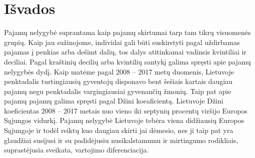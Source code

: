 \documentclass[12pt,a4paper,titlepage]{article}
\begin{document}
\section{Išvados}
Pajamų nelygybė suprantama kaip pajamų skirtumai tarp tam tikrų visuomenės grupių. Kaip jau sužinojome, individai gali būti suskirstyti pagal uždirbamas pajamas į penkias arba dešimt dalių, tos dalys atitinkamai vadinsis kvintiliai ir deciliai. Pagal kraštinių decilių arba kvintilių santykį galima spręsti apie pajamų nelygybės dydį. Kaip matėme pagal 2008 – 2017 metų duomenis, Lietuvoje penktadalis turtingiausių gyventojų disponavo bent šešiais kartais daugiau pajamų negu penktadalis vargingiausiai gyvenančių žmonių. Taip pat apie pajamų pajamų galima spręsti pagal Džini koeaficientą. Lietuvoje Džini koeficientas 2008 – 2017 metais nuo vieno iki septynių procentų viršijo Europos Sąjungos vidurkį. Pajamų nelygybė Lietuvoje tebėra viena didžiausių Europos Sąjungoje ir todėl reiktų kuo daugiau skirti jai dėmesio, nes ji taip pat yra glaudžiai susijusi ir su padidėjusiu nusikalstamumu ir mirtingumo rodikliais, suprastėjusia sveikata, vartojimo diferenciacija.

\newpage
\nocite{*}
\printbibliography[title={Literatūra}]
\end{document}
